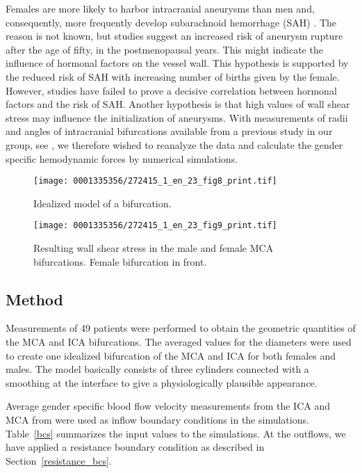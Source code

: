 Females are more likely to harbor intracranial aneurysms than men and,
consequently, more frequently develop subarachnoid hemorrhage
(SAH) \citep{EdenMeurerSanchezEtAl2008}. The reason is not known, but
studies suggest an increased risk of aneurysm rupture after the age of
fifty, in the postmenopausal years. This might indicate the influence
of hormonal factors on the vessel wall. This hypothesis is supported
by the reduced risk of SAH with increasing number of
births given by the female. However, studies
have failed to prove a decisive correlation between hormonal factors
and the risk of SAH. Another hypothesis is that high values of wall
shear stress may influence the initialization of aneurysms. With
measurements of radii and angles of intracranial bifurcations
available from a previous study in our group,
see \citet{IngebrigtsenMorganFaulderEtAl2004}, we therefore wished to
reanalyze the data and calculate the gender specific hemodynamic
forces by numerical simulations.

\begin{figure}[!t]
\centering
\texttt{[image: 0001335356/272415\_1\_en\_23\_fig8\_print.tif]}
\caption{Idealized model of a bifurcation.}
\label{fig:kvs-2:bif}\vspace*{10pt}
\end{figure}

\begin{figure}[!t]
\centering
\texttt{[image: 0001335356/272415\_1\_en\_23\_fig9\_print.tif]}
\caption{Resulting wall shear stress in the male and female MCA
bifurcations. Female bifurcation in front.}\label{fig:kvs-2:mca_wss_res}\vspace*{4pt}
\end{figure}


\subsection{Method}

Measurements of 49 patients were performed to obtain the geometric
quantities of the MCA and ICA bifurcations. The averaged values for
the diameters were used to create one idealized bifurcation of the MCA
and ICA for both females and males. The model basically consists of
three cylinders connected with a smoothing at the interface to give a
physiologically plausible appearance.

Average gender specific blood flow velocity measurements from the ICA
and MCA from \citet{KrejzaSzydlikLiebeskindEtAl2005} were used as
inflow boundary conditions in the simulations. Table~\ref{bcs}
summarizes the input values to the simulations.
At the outflows, we have applied a resistance boundary condition as described in
Section~\ref{resistance_bcs}.

